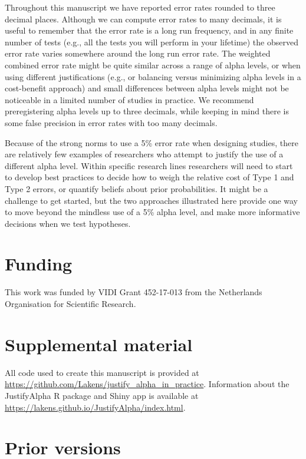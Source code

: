 \documentclass[
  english,
  ,man, a4paper,floatsintext]{apa6}
\begin{document}
Throughout this manuscript we have reported error rates rounded to three decimal places. Although we can compute error rates to many decimals, it is useful to remember that the error rate is a long run frequency, and in any finite number of tests (e.g., all the tests you will perform in your lifetime) the observed error rate varies somewhere around the long run error rate. The weighted combined error rate might be quite similar across a range of alpha levels, or when using different justifications (e.g., or balancing versus minimizing alpha levels in a cost-benefit approach) and small differences between alpha levels might not be noticeable in a limited number of studies in practice. We recommend preregistering alpha levels up to three decimals, while keeping in mind there is some false precision in error rates with too many decimals.

Because of the strong norms to use a 5\% error rate when designing studies, there are relatively few examples of researchers who attempt to justify the use of a different alpha level. Within specific research lines researchers will need to start to develop best practices to decide how to weigh the relative cost of Type 1 and Type 2 errors, or quantify beliefs about prior probabilities. It might be a challenge to get started, but the two approaches illustrated here provide one way to move beyond the mindless use of a 5\% alpha level, and make more informative decisions when we test hypotheses.

\hypertarget{funding}{%
\section{Funding}\label{funding}}

This work was funded by VIDI Grant 452-17-013 from the Netherlands Organisation for Scientific Research.

\hypertarget{supplemental-material}{%
\section{Supplemental material}\label{supplemental-material}}

All code used to create this manuscript is provided at \url{https://github.com/Lakens/justify_alpha_in_practice}. Information about the JustifyAlpha R package and Shiny app is available at \url{https://lakens.github.io/JustifyAlpha/index.html}.

\hypertarget{prior-versions}{%
\section{Prior versions}\label{prior-versions}}
\end{document}
